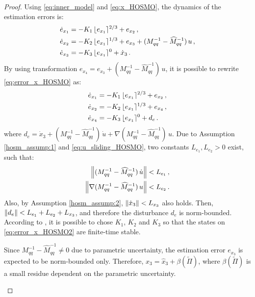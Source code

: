 \begin{proof}

%
Using \eqref{eq:inner_model} and \eqref{eq:x_HOSMO}, the dynamics of the estimation errors is:
%
\begin{align}
\dot{e}_{x_1} &= -K_1 \, \lfloor e_{x_1} \rceil^{2/3} + e_{x_2} \,, \nonumber \\
\dot{e}_{x_2} &= -K_2 \, \lfloor e_{x_1} \rceil^{1/3} + e_{x_3} + (M^{-1}_{qq} - \widehat{M}^{-1}_{qq}) \, u \,, \nonumber \\
\dot{e}_{x_3} &= -K_3 \, \lfloor e_{x_1} \rceil^{0} + \dot{x}_3 \,.
\label{eq:error_x_HOSMO}
\end{align}
%
By using transformation $e_{x_4} = e_{x_3} + (M^{-1}_{qq} - \widehat{M}^{-1}_{qq}) \, u$, it is possible to rewrite \eqref{eq:error_x_HOSMO} as:
%
%
\begin{align}
\dot{e}_{x_1} &= -K_1 \, \lfloor e_{x_1} \rceil^{2/3} + e_{x_2} \,, \nonumber \\
\dot{e}_{x_2} &= -K_2 \, \lfloor e_{x_1} \rceil^{1/3} + e_{x_4} \,, \nonumber \\
\dot{e}_{x_4} &= -K_3 \, \lfloor e_{x_1} \rceil^{0} + d_{e} \,.
\label{eq:error_x_HOSMO2}
\end{align}
%
where $d_e = \dot{x}_3 + (M^{-1}_{qq} - \widehat{M}^{-1}_{qq}) \, \dot{u} + \nabla (M^{-1}_{qq} - \widehat{M}^{-1}_{qq}) \, u$. 
%
Due to Assumption \ref{hosm_assump:1} and \eqref{eq:u_sliding_HOSMO}, two constants $L_{e_1}, L_{e_2} > 0$ exist, such that:
%
\begin{align}
\left\lVert (M^{-1}_{qq} - \widehat{M}^{-1}_{qq}) \, \dot{u} \right\rVert &< L_{e_1} \,, \\
\left\lVert \nabla (M^{-1}_{qq} - \widehat{M}^{-1}_{qq}) \, u \right\rVert &< L_{e_2} \,.
\end{align}
%
Also, by Assumption \ref{hosm_assump:2}, $\left\lVert \dot{x}_3 \right\rVert < L_{x_3}$ also holds.
Then, $\left\lVert d_e\right\rVert < L_{e_1} + L_{e_2} + L_{x_3}$, and therefore the disturbance $d_e$ is norm-bounded. According to \cite{Moreno2012_2}, it is possible to chose $K_1$, $K_2$ and $K_3$ so that the states on \eqref{eq:error_x_HOSMO2} are finite-time stable.
%
\begin{remark}
Since $M^{-1}_{qq} - \widehat{M}^{-1}_{qq} \ne 0$ due to parametric uncertainty, the estimation error $e_{x_3}$ is expected to be norm-bounded only. Therefore, $x_3 = \widehat{x}_3 + \mathbb{\beta}(\widetilde{\Pi})$, where $\mathbb{\beta}(\widetilde{\Pi})$ is a small residue dependent on the parametric uncertainty.
\end{remark}


\end{proof}
